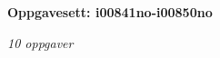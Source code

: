 \centerline{\bf Oppgavesett: i00841no-i00850no}
\vskip 10pt
\centerline{\it 10 oppgaver}\vskip 10pt
\vskip 10pt
